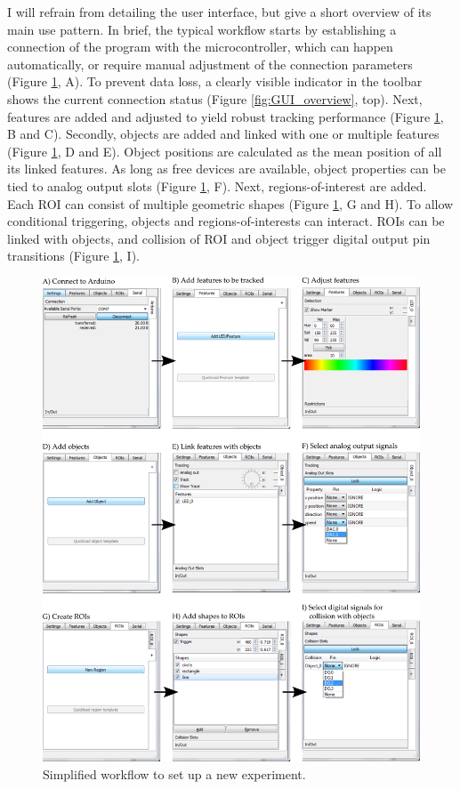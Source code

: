 I will refrain from detailing the user interface, but give a short overview of its main use pattern. In brief, the typical workflow starts by establishing a connection of the program with the microcontroller, which can happen automatically, or require manual adjustment of the connection parameters (Figure \ref{fig:workflow}, A). To prevent data loss, a clearly visible indicator in the toolbar shows the current connection status (Figure \ref{fig:GUI_overview}, top). Next, features are added and adjusted to yield robust tracking performance (Figure \ref{fig:workflow}, B and C). Secondly, objects are added and linked with one or multiple features (Figure \ref{fig:workflow}, D and E). Object positions are calculated as the mean position of all its linked features. As long as free devices are available, object properties can be tied to analog output slots (Figure \ref{fig:workflow}, F). Next, regions-of-interest are added. Each ROI can consist of multiple geometric shapes (Figure \ref{fig:workflow}, G and H). To allow conditional triggering, objects and regions-of-interests can interact. ROIs can be linked with objects, and collision of ROI and object trigger digital output pin transitions (Figure \ref{fig:workflow}, I).

\begin{figure}%
	\centering
		\includegraphics [width=\linewidth]{gfx/workflow.pdf} %
	\caption[Test]{Simplified workflow to set up a new experiment.}
	\label{fig:workflow}
\end{figure}

